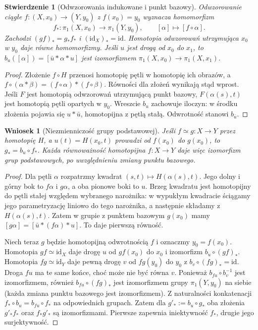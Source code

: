 \documentclass[11pt,a4paper,oneside]{report}
\newcommand{\id}{\mathrm{id}}
\theoremstyle{plain}
\newtheorem{stwierdzenie}[twierdzenie]{Stwierdzenie}
\newtheorem{wniosek}[twierdzenie]{Wniosek}
\theoremstyle{definition}
\theoremstyle{remark}
\begin{document}
\begin{stwierdzenie}[Odwzorowania indukowane i punkt bazowy]
\label{prop:pi1-funktor}
Odwzorowanie ciągłe $f:(X,x_0)\to(Y,y_0)$
z $f(x_0)=y_0$ wyznacza homomorfizm
\[
 f_*:\pi_1(X,x_0)\to\pi_1(Y,y_0),
 \qquad [\alpha]\mapsto[f\circ\alpha].
\]
Zachodzi $(gf)_*=g_*f_*$ i
$(\id_X)_*=\id$. Homotopia odwzorowań
utrzymująca $x_0$ w $y_0$ daje
równe homomorfizmy. Jeśli
$u$ jest drogą od $x_0$ do $x_1$,
to $b_u([\alpha])=[\bar u*\alpha*u]$
jest izomorfizmem
$\pi_1(X,x_0)\to\pi_1(X,x_1)$.
\end{stwierdzenie}
\begin{proof}
Złożenie $f\circ H$ przenosi homotopię
pętli w homotopię ich obrazów, a
$f\circ(\alpha*\beta)
=(f\circ\alpha)*(f\circ\beta)$.
Równości dla złożeń wynikają stąd wprost.
Jeśli $F$ jest homotopią odwzorowań utrzymującą
punkt bazowy, $F(\alpha(s),t)$ jest
homotopią pętli opartych w $y_0$.
Wreszcie $b_u$ zachowuje iloczyn:
w środku złożenia pojawia się
$u*\bar u$, homotopijna z pętlą stałą.
Odwrotność stanowi $b_{\bar u}$.
\end{proof}

\begin{wniosek}[Niezmienniczość grupy podstawowej]
\label{cor:pi1-homotopia}
Jeśli $f\simeq g:X\to Y$ przez homotopię
$H$, a $u(t)=H(x_0,t)$ prowadzi od
$f(x_0)$ do $g(x_0)$, to
$g_*=b_u\circ f_*$. Każda równoważność
homotopijna $f:X\to Y$ daje więc
izomorfizm grup podstawowych,
po uwzględnieniu zmiany punktu bazowego.
\end{wniosek}
\begin{proof}
Dla pętli $\alpha$ rozpatrzmy kwadrat
$(s,t)\mapsto H(\alpha(s),t)$.
Jego dolny i górny bok to $f\alpha$
i $g\alpha$, a oba pionowe boki to
$u$. Brzeg kwadratu jest homotopijny do pętli stałej względem
wybranego narożnika: w wypukłym kwadracie ściągamy jego parametryzację
liniowo do tego narożnika, a następnie składamy z $H(\alpha(s),t)$.
Zatem w grupie z punktem
bazowym $g(x_0)$ mamy
$[g\alpha]=[\bar u*(f\alpha)*u]$.
To daje pierwszą równość.

Niech teraz $g$ będzie homotopijną
odwrotnością $f$ i oznaczmy
$y_0=f(x_0)$. Homotopia
$gf\simeq\id_X$ daje drogę $u$
od $gf(x_0)$ do $x_0$ i
izomorfizm $b_u\circ(gf)_*$.
Homotopia $fg\simeq\id_Y$ daje pewną drogę $v$
od $fg(y_0)$ do $y_0$ z $b_v\circ(fg)_*=\id$.
Droga $fu$ ma te same końce, choć może nie być równa $v$.
Ponieważ $b_{fu}\circ b_v^{-1}$ jest izomorfizmem,
również $b_{fu}\circ(fg)_*$ jest izomorfizmem grupy
$\pi_1(Y,y_0)$ na siebie
(każda zmiana punktu bazowego
jest izomorfizmem).
Z naturalności konkatenacji
$f_*\circ b_u=b_{f u}\circ f_*$
na odpowiednich grupach.
Zatem dla $g'_*:=b_u\circ g_*$
oba złożenia $g'_*f_*$
oraz $f_*g'_*$ są izomorfizmami.
Pierwsze zapewnia iniektywność
$f_*$, drugie jego surjektywność.
\end{proof}
\end{document}
